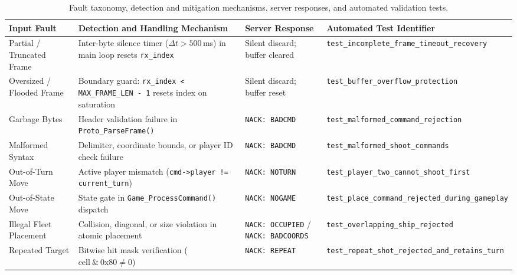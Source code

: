 \begin{table}[t]
\centering
\caption{Fault taxonomy, detection and mitigation mechanisms, server responses, and automated validation tests.}
\label{tab:threats}
\small
\begin{tabular}{@{}L{2.5cm}L{6.2cm}L{2.5cm}L{5.6cm}@{}}
\toprule
\textbf{Input Fault} & \textbf{Detection and Handling Mechanism} & \textbf{Server Response} & \textbf{Automated Test Identifier} \\
\midrule
Partial / Truncated Frame & Inter-byte silence timer ($\Delta t > 500$\,ms) in main loop resets \texttt{rx\_index} & Silent discard; buffer cleared & \texttt{test\_incomplete\_frame\_}\allowbreak\texttt{timeout\_recovery} \\
\addlinespace[2pt]
Oversized / Flooded Frame & Boundary guard: \texttt{rx\_index < MAX\_FRAME\_LEN - 1} resets index on saturation & Silent discard; buffer reset & \texttt{test\_buffer\_overflow\_}\allowbreak\texttt{protection} \\
\addlinespace[2pt]
Garbage Bytes & Header validation failure in \texttt{Proto\_ParseFrame()} & \texttt{NACK: BADCMD} & \texttt{test\_malformed\_command\_}\allowbreak\texttt{rejection} \\
\addlinespace[2pt]
Malformed Syntax & Delimiter, coordinate bounds, or player ID check failure & \texttt{NACK: BADCMD} & \texttt{test\_malformed\_shoot\_}\allowbreak\texttt{commands} \\
\addlinespace[2pt]
Out-of-Turn Move & Active player mismatch (\texttt{cmd->player != current\_turn}) & \texttt{NACK: NOTURN} & \texttt{test\_player\_two\_cannot\_}\allowbreak\texttt{shoot\_first} \\
\addlinespace[2pt]
Out-of-State Move & State gate in \texttt{Game\_ProcessCommand()} dispatch & \texttt{NACK: NOGAME} & \texttt{test\_place\_command\_}\allowbreak\texttt{rejected\_during\_gameplay} \\
\addlinespace[2pt]
Illegal Fleet Placement & Collision, diagonal, or size violation in atomic placement & \texttt{NACK: OCCUPIED} / \texttt{NACK: BADCOORDS} & \texttt{test\_overlapping\_ship\_}\allowbreak\texttt{rejected} \\
\addlinespace[2pt]
Repeated Target & Bitwise hit mask verification ($\text{cell} \ \& \ 0\text{x}80 \ne 0$) & \texttt{NACK: REPEAT} & \texttt{test\_repeat\_shot\_}\allowbreak\texttt{rejected\_and\_retains\_turn} \\
\bottomrule
\end{tabular}
\end{table}

